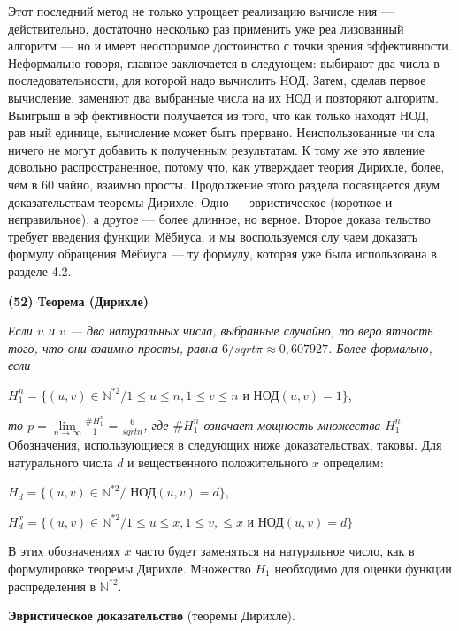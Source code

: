 \documentclass{mai_book}
\begin{document}
Этот последний метод не только упрощает реализацию вычисле­
ния — действительно, достаточно несколько раз применить уже реа­
лизованный алгоритм — но и имеет неоспоримое достоинство с точки
зрения эффективности. Неформально говоря, главное заключается в
следующем: выбирают два числа в последовательности, для которой
надо вычислить НОД. Затем, сделав первое вычисление, заменяют два
выбранные числа на их НОД и повторяют алгоритм. Выигрыш в эф­
фективности получается из того, что как только находят НОД, рав­
ный единице, вычисление может быть прервано. Неиспользованные чи­
сла ничего не могут добавить к полученным результатам. К тому же
это явление довольно распространенное, потому что, как утверждает
теория Дирихле, более, чем в 60%
чайно, взаимно просты. Продолжение этого раздела посвящается двум
доказательствам теоремы Дирихле. Одно — эвристическое (короткое
и неправильное), а другое — более длинное, но верное. Второе доказа­
тельство требует введения функции Мёбиуса, и мы воспользуемся слу­
чаем доказать формулу обращения Мёбиуса — ту формулу, которая
уже была использована в разделе 4.2.

\textbf{(52) Теорема (Дирихле)}

\textit{Если $u$ и $v$ — два натуральных числа, выбранные случайно, то веро­
ятность того, что они взаимно просты, равна $6/sqrt{\pi}\approx 0,607927$. Более формально, если}

$H_{1}^{n}=\{(u,v)\in\mathbb{N}^{*2}/1\leqslant u\leqslant n,1\leqslant v\leqslant n$ и НОД$(u,v)=1\}$,

\textit{то $p=\lim\limits_{n\to\infty}\frac{\#H_{1}^{n}}{1}=\frac{6}{sqrt{n}}$, где $\#H_{1}^{n}$ означает мощность множества $H_{1}^{n}$}
\newpage
Обозначения, использующиеся в следующих ниже доказательствах,
таковы. Для натурального числа $d$ и вещественного положительного $x$
определим:

$H_{d}=\{(u,v)\in\mathbb{N}^{*2}/$ НОД$(u,v)=d\}$,

$H_{d}^x=\{(u,v)\in\mathbb{N}^{*2}/1\leqslant u\leqslant x,1\leqslant v, \leqslant x$ и НОД$(u,v)=d\}$

В этих обозначениях $x$ часто будет заменяться на натуральное число,
как в формулировке теоремы Дирихле. Множество $H_{1}$ необходимо для
оценки функции распределения в $\mathbb{N}^{*2}$.

\textbf{Эвристическое доказательство} (теоремы Дирихле).
\end{document}
